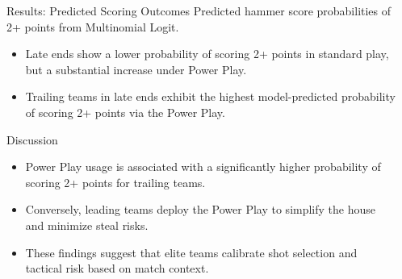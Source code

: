 \documentclass[final]{beamer}
\newlength{\sepwidth}
\newcommand{\separatorcolumn}{\begin{column}{\sepwidth}\end{column}}
\begin{document}
\begin{frame}[t]
\begin{columns}[t]
\begin{column}
\begin{block}{Results: Predicted Scoring Outcomes}
        {\small Predicted hammer score probabilities of 2+ points from Multinomial Logit.}

        \vspace{0.5em}

        \begin{itemize}
          \item Late ends show a lower probability of scoring 2+ points in standard play, but a
                substantial increase under Power Play.
          \item Trailing teams in late ends exhibit the highest model-predicted probability of
                scoring 2+ points via the Power Play.
        \end{itemize}
      \end{block}
      \begin{alertblock}{Discussion}
        \begin{itemize}
          \item Power Play usage is associated with a significantly higher probability of
                scoring 2+ points for trailing teams.
          \item Conversely, leading teams deploy the Power Play to simplify the house and
                minimize steal risks.
          \item These findings suggest that elite teams calibrate shot selection and tactical
                risk based on match context.

        \end{itemize}

      \end{alertblock}

      \nocite{*}
      {\small
        
        
      }

    \end{column}
    \separatorcolumn
  \end{columns}
\end{frame}
\end{document}
